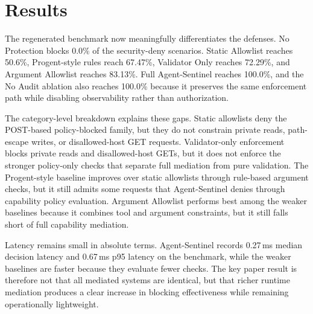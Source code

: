 \section{Results}

The regenerated benchmark now meaningfully differentiates the defenses. No Protection blocks 0.0\% of the security-deny scenarios. Static Allowlist reaches 50.6\%, Progent-style rules reach 67.47\%, Validator Only reaches 72.29\%, and Argument Allowlist reaches 83.13\%. Full Agent-Sentinel reaches 100.0\%, and the No Audit ablation also reaches 100.0\% because it preserves the same enforcement path while disabling observability rather than authorization.

The category-level breakdown explains these gaps. Static allowlists deny the POST-based policy-blocked family, but they do not constrain private reads, path-escape writes, or disallowed-host GET requests. Validator-only enforcement blocks private reads and disallowed-host GETs, but it does not enforce the stronger policy-only checks that separate full mediation from pure validation. The Progent-style baseline improves over static allowlists through rule-based argument checks, but it still admits some requests that Agent-Sentinel denies through capability policy evaluation. Argument Allowlist performs best among the weaker baselines because it combines tool and argument constraints, but it still falls short of full capability mediation.

Latency remains small in absolute terms. Agent-Sentinel records 0.27\,ms median decision latency and 0.67\,ms p95 latency on the benchmark, while the weaker baselines are faster because they evaluate fewer checks. The key paper result is therefore not that all mediated systems are identical, but that richer runtime mediation produces a clear increase in blocking effectiveness while remaining operationally lightweight.
